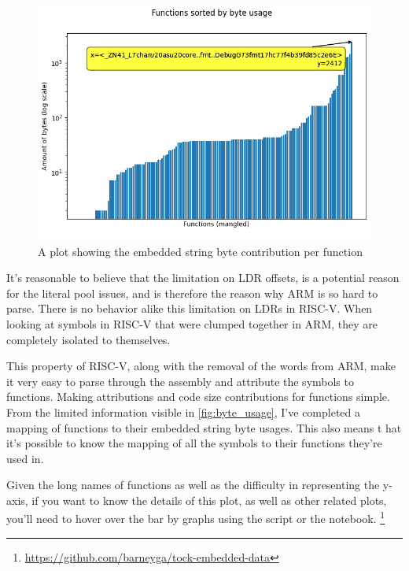 \documentclass{article}
\begin{document}
\begin{figure}[h]
\centering
\includegraphics[width=.8\textwidth]{byte_usage_plot.png}
\caption{\label{fig:byte_usage}A plot showing the embedded string byte contribution per function}
\end{figure}

It's reasonable to believe that the limitation on LDR offsets, is a potential reason for the literal pool issues, and is therefore the reason why ARM is so hard to parse. There is no behavior alike this limitation on LDRs in RISC-V. When looking at symbols in RISC-V that were clumped together in ARM, they are completely isolated to themselves.

This property of RISC-V, along with the removal of the words from ARM, make it very easy to parse through the assembly and attribute the symbols to functions. Making attributions and code size contributions for functions simple. From the limited information visible in  \autoref{fig:byte_usage}, I've completed a mapping of functions to their embedded string byte usages. This also means t hat it's possible to know the mapping of all the symbols to their functions they're used in.

Given the long names of functions as well as the difficulty in representing the y-axis, if you want to know the details of this plot, as well as other related plots, you'll need to hover over the bar by graphs using the script or the notebook. \footnote{\url{https://github.com/barneyga/tock-embedded-data}}
\end{document}
